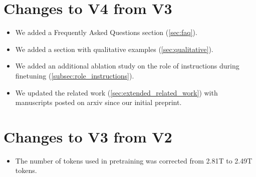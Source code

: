 \section*{Changes to V4 from V3}
\begin{itemize}
    \item We added a Frequently Asked Questions section (\cref{sec:faq}).
    \item We added a section with qualitative examples (\cref{sec:qualitative}).
    \item We added an additional ablation study on the role of instructions during finetuning (\cref{subsec:role_instructions}).
    \item We updated the related work (\cref{sec:extended_related_work}) with manuscripts posted on arxiv since our initial preprint.
\end{itemize}

\section*{Changes to V3 from V2}
\begin{itemize}
    \item The number of tokens used in pretraining was corrected from 2.81T to 2.49T tokens.
\end{itemize}

